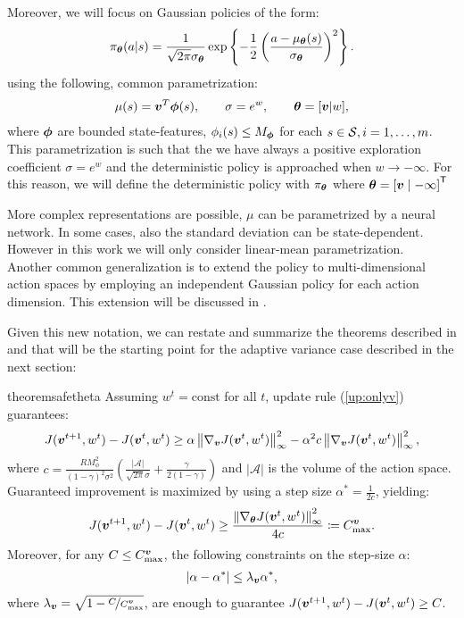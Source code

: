 Moreover, we will focus on Gaussian policies of the form:
\[
	\pi_{\vtheta}(a\vert s) = \frac{1}{\sqrt{2\pi}\sigma_{\vtheta}}\exp\left\{-\frac{1}{2}\left(\frac{a - \mu_{\vtheta}(s)}{\sigma_{\vtheta}}\right)^2\right\}.
\]
using the following, common parametrization:
\begin{align}\label{eq:parametrization}
\mu(s)=\vv^T\vphi(s), \qquad \sigma=e^w, \qquad \vtheta=[\vv\vert w],
\end{align}
where $\vphi$ are bounded state-features, \ie $\phi_i(s) \leq M_{\vphi}$ for each $s\in\Sspace, i=1,\dots,m$.
This parametrization is such that the we have always a positive exploration coefficient $\sigma=e^w$ and the deterministic policy is approached when $w \rightarrow -\infty$. For this reason, we will define the deterministic policy with $\pi_{\vtheta}$ where $\vtheta = \transpose{[\vv \mid -\infty]}$


More complex representations are possible, \eg $\mu$ can be parametrized by a neural network. In some cases, also the standard deviation can be state-dependent. However in this work we will only consider linear-mean parametrization. \\
Another common generalization is to extend the policy to multi-dimensional action spaces by employing an independent Gaussian policy for each action dimension. This extension will be discussed in .

Given this new notation, we can restate and summarize the theorems described in  and  that will be the starting point for the adaptive variance case described in the next section:
\begin{restatable}{theorem}{safetheta}\label{th:safetheta}
	Assuming $w^t = \text{const} $ for all $t$, update rule (\ref{up:onlyv}) guarantees:
	\begin{align}\label{stat:1_1}
	J(\vv^{t+1}, w^t) - J(\vv^t, w^t) \geq \alpha\norm[\infty]{\gradJ[\vv]{\vv^t,w^t}}^2 - 
	\alpha^2 c \norm[\infty]{\gradJ[\vv]{\vv^t,w^t}}^2,
	\end{align}
	where $c = \frac{RM_{\phi}^2}{(1-\gamma)^2\sigma^2}\left(\frac{|\mathcal{A}|}{\sqrt{2\pi}\sigma} +	\frac{\gamma}{2(1-\gamma)}\right)$ and  $|\mathcal{A}|$ is the volume of the action space. Guaranteed improvement is maximized by using a step size $\alpha^* = \frac{1}{2c}$, yielding:
	\begin{align}\label{stat:1_2}
	J(\vv^{t+1},w^t) - J(\vv^t,w^t) \geq \frac{\norm[\infty]{\gradJ{\vv^t,w^t}}^2}{4c}
	\coloneqq C_{\text{max}}^{\vv}.
	\end{align}
	Moreover, for any $C\leq C_{\text{max}}^{\vv}$, the following constraints on the step-size $\alpha$:
	\begin{align}\label{stat:1_3}
	|\alpha - \alpha^*| \leq \lambda_{\vv}\alpha^*, 
	\end{align}
	where $\lambda_{\vv}=\sqrt{1 - \nicefrac{C}{C_{\text{max}}^{\vv}}}$, are enough to guarantee $J(\vv^{t+1},w^t) - J(\vv^t,w^t)\geq C$.
\end{restatable}

